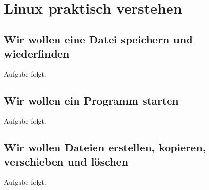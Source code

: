 \part{Linux praktisch verstehen}

\chapter{Wir wollen eine Datei speichern und wiederfinden}


\kapitelstruktur

\begin{aufgabeBox}
Aufgabe folgt.
\end{aufgabeBox}


\chapter{Wir wollen ein Programm starten}


\kapitelstruktur

\begin{aufgabeBox}
Aufgabe folgt.
\end{aufgabeBox}


\chapter{Wir wollen Dateien erstellen, kopieren, verschieben und löschen}


\kapitelstruktur

\begin{aufgabeBox}
Aufgabe folgt.
\end{aufgabeBox}


